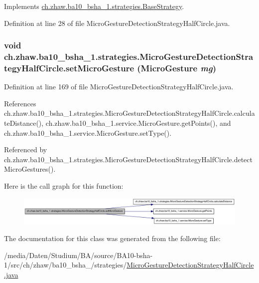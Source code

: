 Implements \hyperlink{classch_1_1zhaw_1_1ba10__bsha__1_1_1strategies_1_1BaseStrategy_af6ea27835befac71906915236a347450}{ch.zhaw.ba10\_\-bsha\_\-1.strategies.BaseStrategy}.

Definition at line 28 of file MicroGestureDetectionStrategyHalfCircle.java.\hypertarget{classch_1_1zhaw_1_1ba10__bsha__1_1_1strategies_1_1MicroGestureDetectionStrategyHalfCircle_aa8cae44f2d4c56a05d29eb5a1c53abdd}{
\subsubsection[{setMicroGesture}]{\setlength{\rightskip}{0pt plus 5cm}void ch.zhaw.ba10\_\-bsha\_\-1.strategies.MicroGestureDetectionStrategyHalfCircle.setMicroGesture ({\bf MicroGesture} {\em mg})}}
\label{classch_1_1zhaw_1_1ba10__bsha__1_1_1strategies_1_1MicroGestureDetectionStrategyHalfCircle_aa8cae44f2d4c56a05d29eb5a1c53abdd}


Definition at line 169 of file MicroGestureDetectionStrategyHalfCircle.java.

References ch.zhaw.ba10\_\-bsha\_\-1.strategies.MicroGestureDetectionStrategyHalfCircle.calculateDistance(), ch.zhaw.ba10\_\-bsha\_\-1.service.MicroGesture.getPoints(), and ch.zhaw.ba10\_\-bsha\_\-1.service.MicroGesture.setType().

Referenced by ch.zhaw.ba10\_\-bsha\_\-1.strategies.MicroGestureDetectionStrategyHalfCircle.detectMicroGestures().

Here is the call graph for this function:\nopagebreak
\begin{figure}[H]
\begin{center}
\leavevmode
\includegraphics[width=420pt]{classch_1_1zhaw_1_1ba10__bsha__1_1_1strategies_1_1MicroGestureDetectionStrategyHalfCircle_aa8cae44f2d4c56a05d29eb5a1c53abdd_cgraph}
\end{center}
\end{figure}


The documentation for this class was generated from the following file:\begin{DoxyCompactItemize}
\item 
/media/Daten/Studium/BA/source/BA10-\/bsha-\/1/src/ch/zhaw/ba10\_\-bsha\_/strategies/\hyperlink{MicroGestureDetectionStrategyHalfCircle_8java}{MicroGestureDetectionStrategyHalfCircle.java}\end{DoxyCompactItemize}
